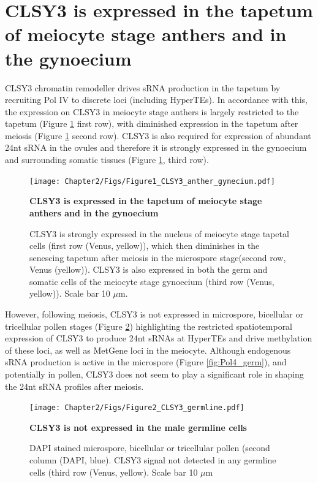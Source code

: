 \section{CLSY3 is expressed in the tapetum of meiocyte stage anthers and in the gynoecium}

CLSY3 chromatin remodeller drives sRNA production in the tapetum \citep{RN187} by recruiting Pol IV to discrete loci (including HyperTEs)\citep{RN23}. In accordance with this, the expression on CLSY3 in meiocyte stage anthers is largely restricted to the tapetum (Figure \ref{fig:CLSY3_anther} first row), with diminished expression in the tapetum after meiosis (Figure \ref{fig:CLSY3_anther} second row). CLSY3 is also required for expression of abundant 24nt sRNA in the ovules and therefore it is strongly expressed in the gynoecium and surrounding somatic tissues (Figure \ref{fig:CLSY3_anther}, third row).

\begin{figure}[htbp!] 
\centering    
    \texttt{[image: Chapter2/Figs/Figure1\_CLSY3\_anther\_gynecium.pdf]}
\caption{\textbf{CLSY3 is expressed in the tapetum of meiocyte stage anthers and in the gynoecium}}
\label{fig:CLSY3_anther}
\captionsetup{font=small}
    \caption*{CLSY3 is strongly expressed in the nucleus of meiocyte stage tapetal cells (first row (Venus, yellow)), which then diminishes in the senescing tapetum after meiosis in the microspore stage(second row, Venus (yellow)). CLSY3 is also expressed in both the germ and somatic cells of the meiocyte stage gynoecium (third row (Venus, yellow)). Scale bar 10 $\mu$m.}
\end{figure}

However, following meiosis, CLSY3 is not expressed in microspore, bicellular or tricellular pollen stages (Figure \ref{fig:CLSY3_germ}) highlighting the restricted spatiotemporal expression of CLSY3 to produce 24nt sRNAs at HyperTEs and drive methylation of these loci, as well as MetGene loci in the meiocyte. Although endogenous sRNA production is active in the microspore (Figure \ref{fig:Pol4_germ}), and potentially in pollen, CLSY3 does not seem to play a significant role in shaping the 24nt sRNA profiles after meiosis.

\begin{figure}[htbp!] 
\centering    
    \texttt{[image: Chapter2/Figs/Figure2\_CLSY3\_germline.pdf]}
\caption{\textbf{CLSY3 is not expressed in the male germline cells}}
\label{fig:CLSY3_germ}
\captionsetup{font=small}
    \caption*{DAPI stained microspore, bicellular or tricellular pollen (second column (DAPI, blue). CLSY3 signal not detected in any germline cells (third row (Venus, yellow). Scale bar 10 $\mu$m}
\end{figure}



